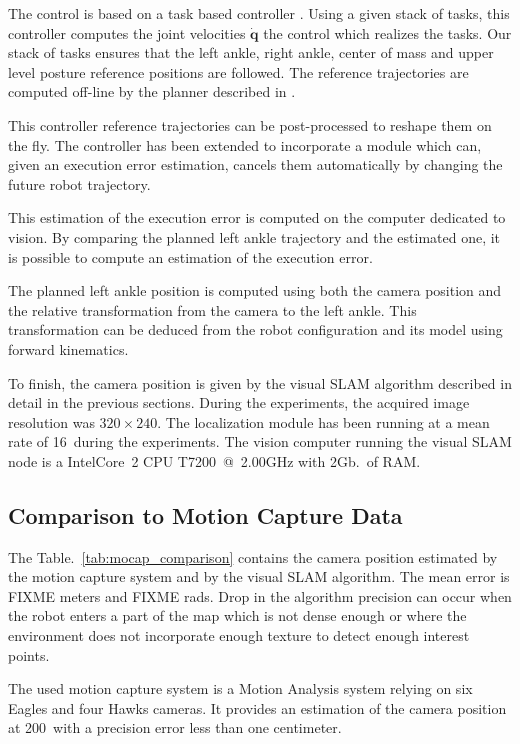 The control is based on a task based controller
\cite{Mansard09icar}. Using a given stack of tasks, this controller
computes the joint velocities $\mathbf{\dot{q}}$ the control which
realizes the tasks. Our stack of tasks ensures that the left ankle,
right ankle, center of mass and upper level posture reference
positions are followed. The reference trajectories are computed
off-line by the planner described in \cite{Dalibard11humanoids}.

This controller reference trajectories can be post-processed to
reshape them on the fly. The controller has been extended to
incorporate a module which can, given an execution error estimation,
cancels them automatically by changing the future robot trajectory.


This estimation of the execution error is computed on the computer
dedicated to vision. By comparing the planned left ankle trajectory
and the estimated one, it is possible to compute an estimation of the
execution error.

The planned left ankle position is computed using both the camera
position and the relative transformation from the camera to the left
ankle. This transformation can be deduced from the robot configuration
and its model using forward kinematics.

To finish, the camera position is given by the visual SLAM algorithm
described in detail in the previous sections. During the experiments,
the acquired image resolution was $320 \times 240$. The localization
module has been running at a mean rate of 16\hertz~during the
experiments. The vision computer running the visual SLAM node is a
Intel\textregistered Core\texttrademark\ 2 CPU T7200~@~2.00GHz with 2Gb.\ of RAM.


\subsection{Comparison to Motion Capture Data}\label{sec:mocap}

The Table.~\ref{tab:mocap_comparison} contains the camera position
estimated by the motion capture system and by the visual SLAM
algorithm. The mean error is FIXME meters and FIXME rads. Drop in the
algorithm precision can occur when the robot enters a part of the map
which is not dense enough or where the environment does not
incorporate enough texture to detect enough interest points.


The used motion capture system is a Motion Analysis system relying on
six Eagles and four Hawks cameras. It provides an estimation of the
camera position at 200\hertz~with a precision error less than one
centimeter.

